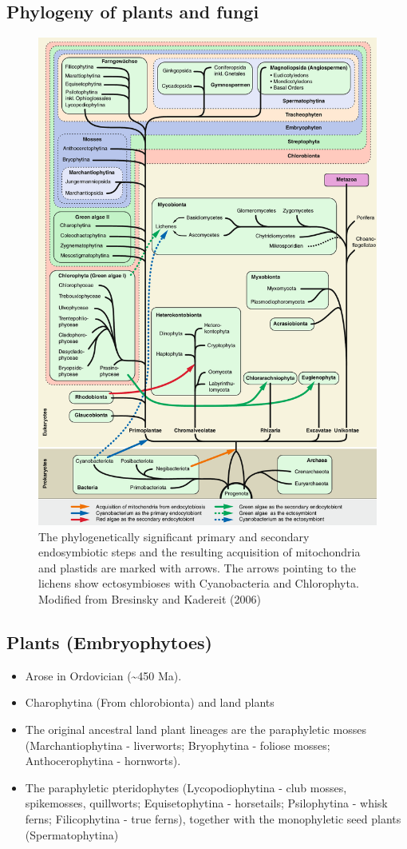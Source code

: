 \documentclass[ignorenonframetext,aspectratio=169]{beamer}
\providecommand{\tightlist}{%
  \setlength{\itemsep}{0pt}\setlength{\parskip}{0pt}}
\begin{document}
\hypertarget{phylogeny-of-plants-and-fungi}{%
\subsection{Phylogeny of plants and
fungi}\label{phylogeny-of-plants-and-fungi}}

\begin{frame}{}
\protect\hypertarget{section-22}{}

\begin{figure}
\includegraphics[width=0.32\linewidth]{./../images/phylogeny_plant_fungi} \caption{The phylogenetically significant primary and secondary endosymbiotic steps and the resulting acquisition of mitochondria and plastids are marked with arrows. The arrows pointing to the lichens show ectosymbioses with Cyanobacteria and Chlorophyta. Modified from Bresinsky and Kadereit (2006)}\label{fig:phylogenetic-plant-fungi}
\end{figure}

\end{frame}

\hypertarget{plants-embryophytoes}{%
\subsection{Plants (Embryophytoes)}\label{plants-embryophytoes}}

\begin{frame}{}
\protect\hypertarget{section-23}{}

\begin{itemize}
\tightlist
\item
  Arose in Ordovician (\textasciitilde{}450 Ma).
\item
  Charophytina (From chlorobionta) and land plants
\item
  The original ancestral land plant lineages are the paraphyletic mosses
  (Marchantiophytina - liverworts; Bryophytina - foliose mosses;
  Anthocerophytina - hornworts).
\item
  The paraphyletic pteridophytes (Lycopodiophytina - club mosses,
  spikemosses, quillworts; Equisetophytina - horsetails; Psilophytina -
  whisk ferns; Filicophytina - true ferns), together with the
  monophyletic seed plants (Spermatophytina)
\end{itemize}

\end{frame}
\end{document}
